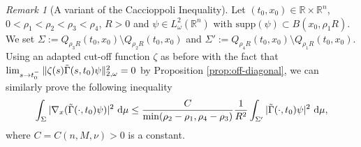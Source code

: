 \documentclass[12pt, letterpaper]{amsart}
\theoremstyle{definition}
\theoremstyle{remark}
\newtheorem{rem}[thm]{Remark}
\numberwithin{equation}{section}
\begin{document}
\begin{rem}[A variant of the Caccioppoli Inequality]\label{rem:varCaccioppoli}
Let $(t_0,x_0)\in \mathbb{R}\times \mathbb{R}^n$, $0 < \rho_1 < \rho_2 < \rho_3 < \rho_4$, $R>0$ and $\psi \in L^2_\omega(\mathbb{R}^n)$ with $\mathrm{supp}(\psi) \subset B(x_0,\rho_1 R)$. We set $\Sigma:=Q_{\rho_3 R}(t_0, x_0) \setminus Q_{\rho_2 R}(t_0, x_0)$ and $\Sigma':=Q_{\rho_4 R}(t_0, x_0) \setminus Q_{\rho_1 R}(t_0, x_0)$. Using an adapted cut-off function $\zeta$ as before with the fact that $\lim_{s \to t_0^{^-}} \| \zeta(s) \Tilde{\Gamma}(s,t_0)\psi \|^2_{2,\omega}=0 $ by Proposition \ref{prop:off-diagonal}, we can similarly prove the following inequality
\begin{equation}\label{Variante Caccioppoli}
    \int_{\Sigma} | \nabla_x (\Tilde{\Gamma}(\cdot,t_0)\psi) |^2 \ \mathrm{d\mu} \leq \frac{C}{\min(\rho_2 - \rho_1, \rho_4 - \rho_3)} \frac{1}{R^2} \int_{\Sigma'} | \Tilde{\Gamma}(\cdot,t_0)\psi |^2 \ \mathrm{d\mu},
\end{equation}
where $C = C(n,M, \nu) > 0$ is a constant.
\end{rem}
\end{document}

